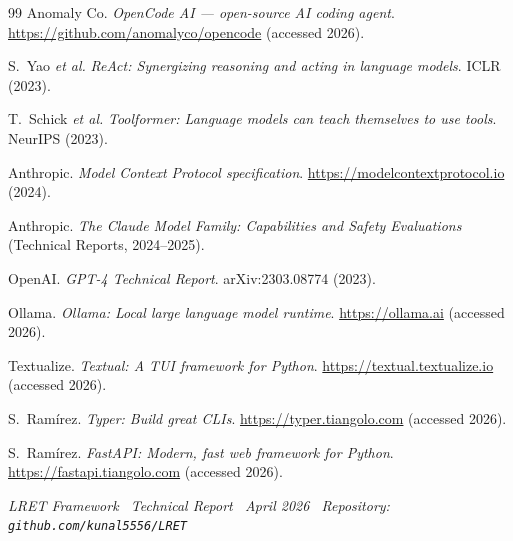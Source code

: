 \documentclass[11pt,a4paper]{article}
\begin{document}
\begin{thebibliography}{99}
  Anomaly Co.
  \textit{OpenCode AI --- open-source AI coding agent}.
  \url{https://github.com/anomalyco/opencode} (accessed 2026).

  S.~Yao \textit{et al.}
  \textit{ReAct: Synergizing reasoning and acting in language models}. ICLR (2023).

  T.~Schick \textit{et al.}
  \textit{Toolformer: Language models can teach themselves to use tools}.
  NeurIPS (2023).

  Anthropic.
  \textit{Model Context Protocol specification}.
  \url{https://modelcontextprotocol.io} (2024).

  Anthropic.
  \textit{The Claude Model Family: Capabilities and Safety Evaluations}
  (Technical Reports, 2024--2025).

  OpenAI.
  \textit{GPT-4 Technical Report}. arXiv:2303.08774 (2023).

  Ollama.
  \textit{Ollama: Local large language model runtime}.
  \url{https://ollama.ai} (accessed 2026).

  Textualize.
  \textit{Textual: A TUI framework for Python}.
  \url{https://textual.textualize.io} (accessed 2026).

  S.~Ram\'irez.
  \textit{Typer: Build great CLIs}. \url{https://typer.tiangolo.com} (accessed 2026).

  S.~Ram\'irez.
  \textit{FastAPI: Modern, fast web framework for Python}.
  \url{https://fastapi.tiangolo.com} (accessed 2026).

\end{thebibliography}

\vspace{2em}
\begin{center}
\small\textit{LRET Framework \textbullet\ Technical Report \textbullet\ April 2026
\textbullet\ Repository: \texttt{github.com/kunal5556/LRET}}
\end{center}
\end{document}
